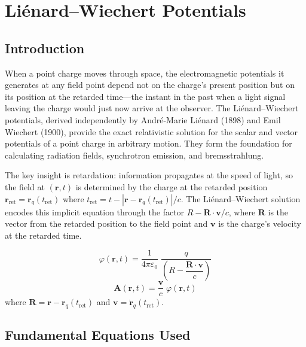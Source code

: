 \chapter{Liénard--Wiechert Potentials}

\section*{Introduction}

When a point charge moves through space, the electromagnetic potentials it generates at any field point depend not on the charge's present position but on its position at the retarded time---the instant in the past when a light signal leaving the charge would just now arrive at the observer. The Liénard--Wiechert potentials, derived independently by André-Marie Liénard (1898) and Emil Wiechert (1900), provide the exact relativistic solution for the scalar and vector potentials of a point charge in arbitrary motion. They form the foundation for calculating radiation fields, synchrotron emission, and bremsstrahlung.

The key insight is retardation: information propagates at the speed of light, so the field at $(\mathbf{r}, t)$ is determined by the charge at the retarded position $\mathbf{r}_{\text{ret}} = \mathbf{r}_{q}(t_{\text{ret}})$ where $t_{\text{ret}} = t - |\mathbf{r} - \mathbf{r}_{q}(t_{\text{ret}})|/c$. The Liénard--Wiechert solution encodes this implicit equation through the factor $R - \mathbf{R}\cdot\mathbf{v}/c$, where $\mathbf{R}$ is the vector from the retarded position to the field point and $\mathbf{v}$ is the charge's velocity at the retarded time.


\begin{equation}
\boxed{\;\varphi(\mathbf{r},t) = \frac{1}{4\pi\varepsilon_{0}}\;\frac{q}{\left(R - \dfrac{\mathbf{R}\cdot\mathbf{v}}{c}\right)}\;}
\label{eq:lienard-wiechert-phi}
\end{equation}
\begin{equation}
\boxed{\;\mathbf{A}(\mathbf{r},t) = \frac{\mathbf{v}}{c}\;\varphi(\mathbf{r},t)\;}
\label{eq:lienard-wiechert-A}
\end{equation}
where $\mathbf{R} = \mathbf{r} - \mathbf{r}_{q}(t_{\text{ret}})$ and $\mathbf{v} = \dot{\mathbf{r}}_{q}(t_{\text{ret}})$.

\section*{Fundamental Equations Used}

